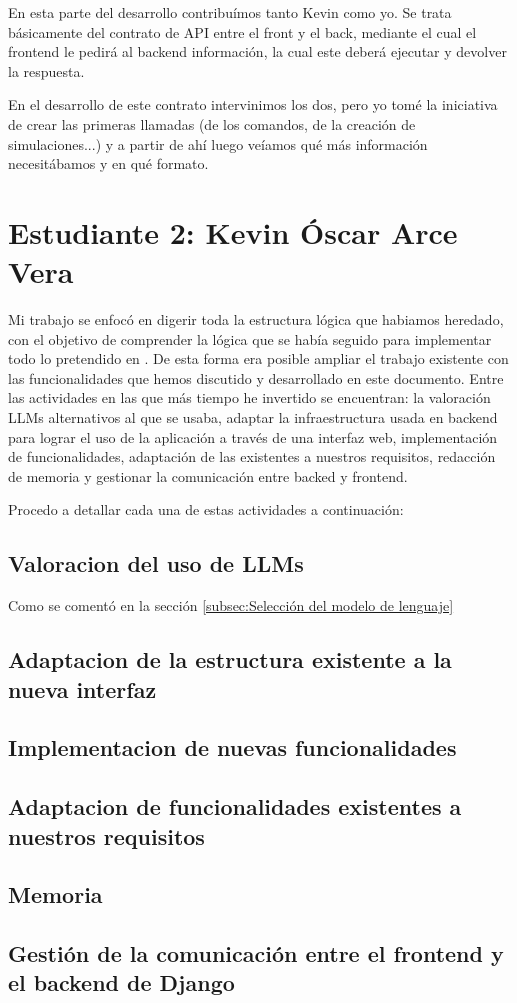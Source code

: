 En esta parte del desarrollo contribuímos tanto Kevin como yo. Se trata básicamente del contrato de API entre el front y el back, mediante el cual el frontend le pedirá al backend información, la cual este deberá ejecutar y devolver la respuesta.

En el desarrollo de este contrato intervinimos los dos, pero yo tomé la iniciativa de crear las primeras llamadas (de los comandos, de la creación de simulaciones...) y a partir de ahí luego veíamos qué más información necesitábamos y en qué formato.

\section*{Estudiante 2: Kevin Óscar Arce Vera}

Mi trabajo se enfocó en digerir toda la estructura lógica que habiamos heredado, con el objetivo de comprender la lógica que se había seguido para implementar todo lo pretendido en \cite{park2023generative}. De esta forma era posible ampliar el trabajo existente con las funcionalidades que hemos discutido y desarrollado en este documento. Entre las actividades en las que más tiempo he invertido se encuentran: la valoración LLMs alternativos al que se usaba,  adaptar la infraestructura usada en backend para lograr el uso de la aplicación a través de una interfaz web, implementación de funcionalidades, adaptación de las existentes a nuestros requisitos, redacción de memoria y gestionar la comunicación entre backed y frontend.

Procedo a detallar cada una de estas actividades a continuación:

\subsection*{Valoracion del uso de LLMs}

Como se comentó en la sección \ref{subsec:Selección del modelo de lenguaje} 

\subsection*{Adaptacion de la estructura existente a la nueva interfaz}
\subsection*{Implementacion de nuevas funcionalidades}
\subsection*{Adaptacion de funcionalidades existentes a nuestros requisitos}
\subsection*{Memoria}
\subsection*{Gestión de la comunicación entre el frontend y el backend de Django}


